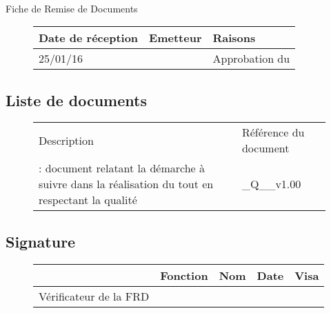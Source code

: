 \documentclass[asi, sansVersion]{picINSA}
\begin{document}
\begin{center}
\huge
\nomEquipe{}\\
Fiche de Remise de Documents\\
\end{center}
\vspace{0.5cm}


\begin{figure}[H]
		\centering
		\begin{tabularx}{17cm}{|p{4cm}|X|X|}
		\hline
		\rowcolor[gray]{0.85}Date de réception & Emetteur & Raisons \\
		\hline
		25/01/16 & \nomEquipe{} & Approbation du \PQ{}\\
		\hline
		\end{tabularx}
\end{figure}

\subsection*{Liste de documents}

\begin{figure}[H]
		\centering
		\begin{tabularx}{17cm}{|p{7cm}|X|}
		\hline
		\rowcolor[gray]{0.85} Description & Référence du document \\
		\PQ{} : document relatant la démarche à suivre dans la réalisation du \PICCourt{} tout en respectant la qualité & \PQCourt\_Q\_\nomEquipe\_v1.00 \\
		\hline 
		\end{tabularx}
\end{figure}

\subsection*{Signature}

\begin{figure}[H]
		\centering
		\begin{tabularx}{17cm}{|p{4cm}|X|X|X|X|}
		\hline
		\rowcolor[gray]{0.85}& Fonction & Nom & Date & Visa \\
		\hline
		 Vérificateur de la FRD & \RGC & \Mathieu &  &  \\
		\hline
		\end{tabularx}
\end{figure}
\end{document}
